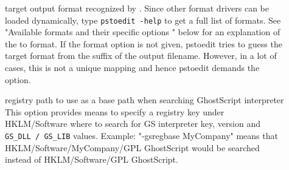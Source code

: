 \documentclass[english,a4paper]{article}
\begin{document}
\begin{description}
\item[] 
target output format recognized by .  Since other format drivers can be loaded dynamically, type  \texttt{pstoedit -help} to get a full list of formats. See  "Available formats and their specific options " below for an explanation of the  to  format. If the format option is not given, pstoedit tries to guess the target format  from the suffix of the output filename. However, in a lot of cases, this is not a unique mapping and hence pstoedit demands the  option.


\item[] 
registry path to use as a base path when searching GhostScript interpreter  
This option provides means to specify a registry key under HKLM/Software where to search for GS interpreter key, version and \verb+GS_DLL / GS_LIB+ values. Example: "-gsregbase MyCompany" means  that HKLM/Software/MyCompany/GPL GhostScript would be searched instead of HKLM/Software/GPL GhostScript. 


\end{description}
\end{document}
